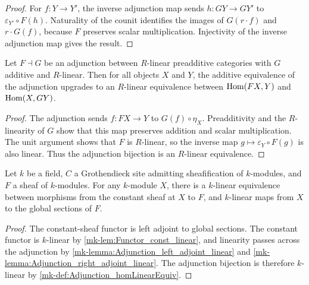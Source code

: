 \begin{proof}
  \leanok
  For \(f:Y\to Y'\), the inverse adjunction map sends \(h:GY\to GY'\) to \(\varepsilon_{Y'}\circ F(h)\). Naturality of the counit identifies the images of \(G(r\cdot f)\) and \(r\cdot G(f)\), because \(F\) preserves scalar multiplication. Injectivity of the inverse adjunction map gives the result.
\end{proof}

\begin{theorem}\label{mk-def:Adjunction_homLinearEquiv}
  \leanok


  Let \(F \dashv G\) be an adjunction between \(R\)-linear preadditive categories with \(G\) additive and \(R\)-linear. Then for all objects \(X\) and \(Y\), the additive equivalence of the adjunction upgrades to an \(R\)-linear equivalence between \(\operatorname{Hom}(FX, Y)\) and \(\operatorname{Hom}(X, GY)\).
\end{theorem}

\begin{proof}
  \leanok
  The adjunction sends \(f:FX\to Y\) to \(G(f)\circ\eta_X\). Preadditivity and the \(R\)-linearity of \(G\) show that this map preserves addition and scalar multiplication. The unit argument shows that \(F\) is \(R\)-linear, so the inverse map \(g\mapsto\varepsilon_Y\circ F(g)\) is also linear. Thus the adjunction bijection is an \(R\)-linear equivalence.
\end{proof}

\begin{theorem}\label{mk-def:Scheme_constantSheafGammaHom_linearEquiv}
  \leanok

  Let \(k\) be a field, \(C\) a Grothendieck site admitting sheafification of \(k\)-modules, and \(F\) a sheaf of \(k\)-modules. For any \(k\)-module \(X\), there is a \(k\)-linear equivalence between morphisms from the constant sheaf at \(X\) to \(F\), and \(k\)-linear maps from \(X\) to the global sections of \(F\).
\end{theorem}

\begin{proof}
  \leanok
  The constant-sheaf functor is left adjoint to global sections. The constant functor is \(k\)-linear by \ref{mk-lem:Functor_const_linear}, and linearity passes across the adjunction by \ref{mk-lemma:Adjunction_left_adjoint_linear} and \ref{mk-lemma:Adjunction_right_adjoint_linear}. The adjunction bijection is therefore \(k\)-linear by \ref{mk-def:Adjunction_homLinearEquiv}.
\end{proof}

